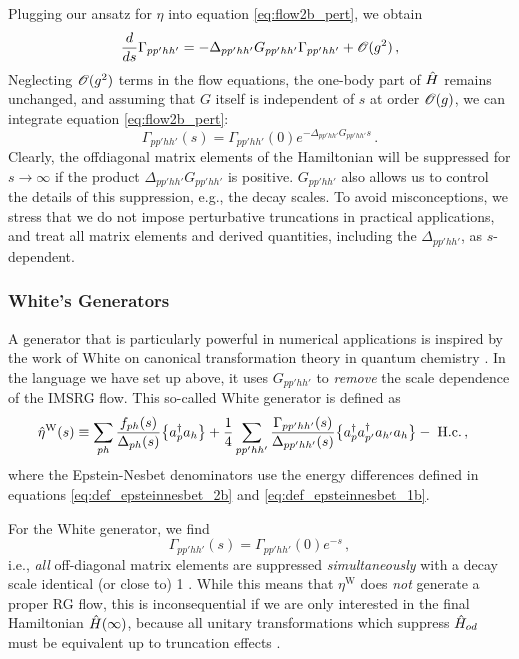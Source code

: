 {Plugging our ansatz for $\eta$ into equation \eqref{eq:flow2b_pert}, we obtain
\begin{equation}
   \frac{d {}} {d {s}} \Gamma_{pp'hh'} 
  =-\Delta_{pp'hh'}G_{pp'hh'}\Gamma_{pp'hh'} + \mathcal{O}(g^2)\,,
\end{equation}
Neglecting $\mathcal{O}(g^2)$ terms in the flow equations, the one-body part of $\hat{H}$ 
remains unchanged, and assuming that $G$ itself is independent of $s$
at order $\mathcal{O}(g)$, we can integrate equation \eqref{eq:flow2b_pert}:
\begin{equation}\label{eq:Gamma_pert}
  \Gamma_{pp'hh'}(s) = \Gamma_{pp'hh'}(0) e^{-\Delta_{pp'hh'}G_{pp'hh'} s}\,.
\end{equation}
Clearly, the offdiagonal matrix elements of the Hamiltonian will be
suppressed for $s\to\infty$ if the product $\Delta_{pp'hh'} G_{pp'hh'}$ 
is positive. $G_{pp'hh'}$ also allows us
to control the details of this suppression, e.g., the decay scales.
To avoid misconceptions, we stress that we do not impose perturbative
truncations in practical applications, and treat all matrix elements 
and derived quantities, including the $\Delta_{pp'hh'}$, as 
$s$-dependent.

%
%
\subsubsection{\label{sec:imsrg_generator_white}White's Generators}
A generator that is particularly powerful in numerical applications is inspired
by the work of White on canonical transformation theory in quantum chemistry 
\cite{White:2002fk,Tsukiyama:2011uq,Hergert:2016jk}. In the language we have
set up above, it uses $G_{pp'hh'}$ to \emph{remove} the scale dependence
of the IMSRG flow. This so-called White generator is defined as
\begin{align}
  \etaO^\text{W}(s)
  &\equiv\sum_{ph}\frac{f_{ph}(s)}{\Delta_{ph}(s)}\nord{\aaO_{p}\aO_{h}}
  +\frac{1}{4}\sum_{pp'hh'}\frac{\Gamma_{pp'hh'}(s)}{\Delta_{pp'hh'}(s)}
    \nord{\aaO_{p}\aaO_{p'}\aO_{h'}\aO_{h}}-\;\text{H.c.}\label{eq:eta_white}\,,
\end{align}
where the Epstein-Nesbet denominators use the energy differences defined in 
equations \eqref{eq:def_epsteinnesbet_2b} and \eqref{eq:def_epsteinnesbet_1b}.

For the White generator, we find
\begin{equation}
  \Gamma_{pp'hh'}(s) = \Gamma_{pp'hh'}(0) e^{-s}\,,
\end{equation}
i.e., \emph{all} off-diagonal matrix 
elements are suppressed \emph{simultaneously} with a decay scale identical (or close to) 1 
\cite{Hergert:2016jk}. 
While this means that $\eta^\text{W}$ does \emph{not} generate a proper RG
flow, this is inconsequential if we are only interested in the final Hamiltonian 
$\hat{H}(\infty)$, because all unitary transformations which suppress $\hat{H}_{od}$ 
must be equivalent up to truncation effects \cite{Hergert:2016jk}.

}
